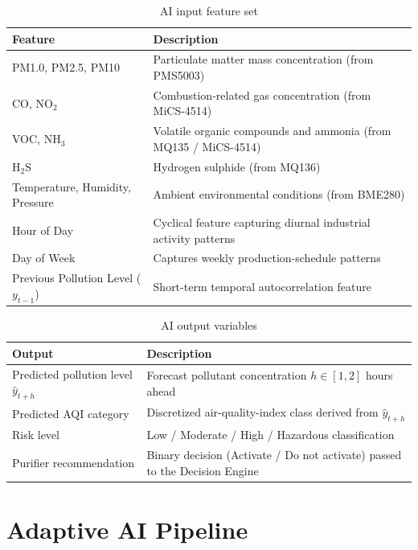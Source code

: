 \begin{table}[htbp]
\centering
\caption{AI input feature set}
\label{tab:features}
\small
\begin{tabular}{@{}p{4.5cm}p{8cm}@{}}
\toprule
\textbf{Feature} & \textbf{Description} \\
\midrule
PM1.0, PM2.5, PM10 & Particulate matter mass concentration (from PMS5003) \\
CO, NO$_2$ & Combustion-related gas concentration (from MiCS-4514) \\
VOC, NH$_3$ & Volatile organic compounds and ammonia (from MQ135 / MiCS-4514) \\
H$_2$S & Hydrogen sulphide (from MQ136) \\
Temperature, Humidity, Pressure & Ambient environmental conditions (from BME280) \\
Hour of Day & Cyclical feature capturing diurnal industrial activity patterns \\
Day of Week & Captures weekly production-schedule patterns \\
Previous Pollution Level ($y_{t-1}$) & Short-term temporal autocorrelation feature \\
\bottomrule
\end{tabular}
\end{table}

\begin{table}[htbp]
\centering
\caption{AI output variables}
\label{tab:ai-output}
\small
\begin{tabular}{@{}p{4.5cm}p{8cm}@{}}
\toprule
\textbf{Output} & \textbf{Description} \\
\midrule
Predicted pollution level $\hat{y}_{t+h}$ & Forecast pollutant concentration $h \in [1,2]$ hours ahead \\
Predicted AQI category & Discretized air-quality-index class derived from $\hat{y}_{t+h}$ \\
Risk level & Low / Moderate / High / Hazardous classification \\
Purifier recommendation & Binary decision (Activate / Do not activate) passed to the Decision Engine \\
\bottomrule
\end{tabular}
\end{table}

\FloatBarrier

\section{Adaptive AI Pipeline}
\label{sec:meth-ai-pipeline}

